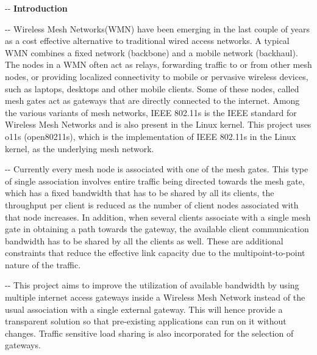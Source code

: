 \documentclass[12pt]{article}
\makeatletter
\newenvironment{indentation}[3]%
	{\par\setlength{\parindent}{#3}
	\setlength{\leftmargin}{#1}       \setlength{\rightmargin}{#1}%
	\advance\linewidth -\leftmargin       \advance\linewidth -\rightmargin%
	\advance\@totalleftmargin\leftmargin  \@setpar{{\@@par}}%
	\parshape 1\@totalleftmargin \linewidth\ignorespaces}{\par}%
\makeatother
\begin{document}
\pagebreak

\begin{indentation}{0pt}{0pt}{0pt}
\textbf{{{\Large Introduction}}}
\end{indentation}
\vspace{0.5cm}
\begin{indentation}{0pt}{0pt}{0pt}
{\normalsize \hspace{1cm} Wireless Mesh Networks(WMN) have been emerging in the last couple of years as a cost effective alternative to traditional wired access networks. A typical WMN combines a fixed network (backbone) and a mobile network (backhaul). The nodes in a WMN often act as relays, forwarding traffic to or from other mesh nodes, or providing localized connectivity to mobile or pervasive wireless devices, such as laptops, desktops and other mobile clients. Some of these nodes, called mesh gates act as gateways that are directly connected to the internet. Among the various variants of mesh networks, IEEE 802.11s is the IEEE standard for Wireless Mesh Networks and is also present in the Linux kernel. This project uses o11s (open80211s), which is the implementation of IEEE 802.11s in the Linux kernel, as the underlying mesh network.}
\end{indentation}

\begin{indentation}{0pt}{0pt}{0pt}
{\normalsize \hspace{1cm}Currently every mesh node is associated with one of the mesh gates. This type of single association involves entire traffic being directed towards the mesh gate, which has a fixed bandwidth that has to be shared by all its clients, the throughput per client is reduced as the number of client nodes associated with that node increases. In addition, when several clients associate with a single mesh gate in obtaining a path towards the gateway, the available client communication bandwidth has to be shared by all the clients as well. These are additional constraints that reduce the effective link capacity due to the multipoint-to-point nature of the traffic.}
\end{indentation}
\begin{indentation}{0pt}{0pt}{0pt}
{\normalsize \hspace{1cm}This project aims to improve the utilization of available bandwidth by using multiple internet access gateways inside a Wireless Mesh Network instead of the usual association with a single external gateway. This will hence provide a transparent solution so that pre-existing applications can run on it without changes. Traffic sensitive load sharing is also incorporated for the selection of gateways.}
\end{indentation}
\end{document}

